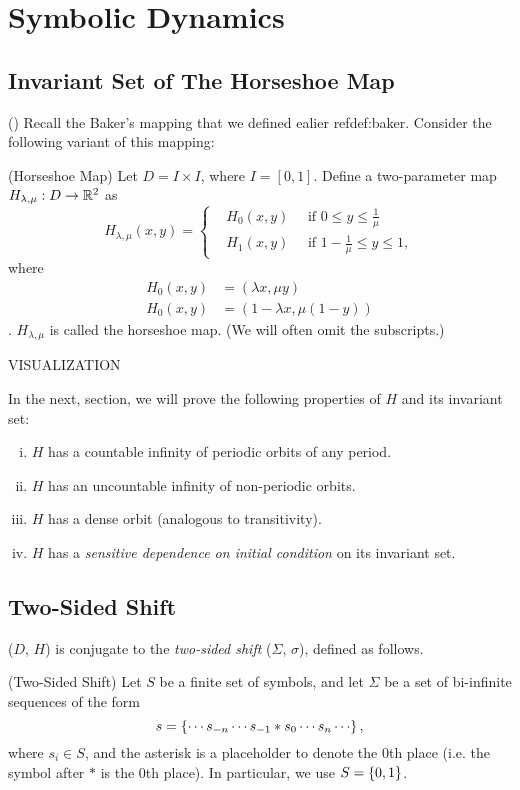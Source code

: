 \documentclass[12pt,twoside,draft]{book}
\begin{document}
\chapter{Symbolic Dynamics}
\section{Invariant Set of The Horseshoe Map}
(\citep{wiggins})
Recall the Baker's mapping that we defined ealier ref{def:baker}.
Consider the following variant of this mapping:
\begin{definition}
  (Horseshoe Map)
  Let $D = I \times I$, where $I = [0,1]$.
  Define a two-parameter map $H_{\lambda, \mu}: D \to \mathbb{R}^2$ as
  \begin{equation*}
    H_{\lambda, \mu}(x,y) =
    \begin{cases}
      &H_0(x,y) \quad\mbox{ if } 0 \leq y \leq \frac{1}{\mu}   \\
      &H_1(x,y) \quad\mbox{ if } 1 - \frac{1}{\mu} \leq y \leq 1,
    \end{cases}
  \end{equation*}
  where
  \begin{align*}
    H_0(x,y) &= (\lambda x, \mu y)  \\
    H_0(x,y) &= (1 - \lambda x, \mu(1 - y)) 
  \end{align*}.
  $H_{\lambda, \mu}$ is called the horseshoe map.
  (We will often omit the subscripts.)
\end{definition}

VISUALIZATION

In the next, section, we will prove the following properties of $H$ and its invariant set:
\begin{enumerate}[(i)]
  \item $H$ has a countable infinity of periodic orbits of any period.
  \item $H$ has an uncountable infinity of non-periodic orbits.
  \item $H$ has a dense orbit (analogous to transitivity).
  \item $H$ has a \textit{sensitive dependence on initial condition} on its invariant set.
\end{enumerate}

\section{Two-Sided Shift}
($D$, $H$) is conjugate to the \textit{two-sided shift} ($\Sigma$, $\sigma$), defined as follows.
\begin{definition}
  (Two-Sided Shift)
  Let $S$ be a finite set of symbols, and let $\Sigma$ be a set of bi-infinite sequences of the form
  \begin{equation*}
    s = \set{ \cdots s_{-n} \cdots s_{-1} * s_0 \cdots s_n \cdots },
  \end{equation*}
  where $s_i \in S$, and the asterisk is a placeholder to denote the 0th place (i.e. the symbol after $*$ is the 0th place).
  In particular, we use $S = \left \{ 0,1 \right \}$.
\end{definition}
\end{document}
